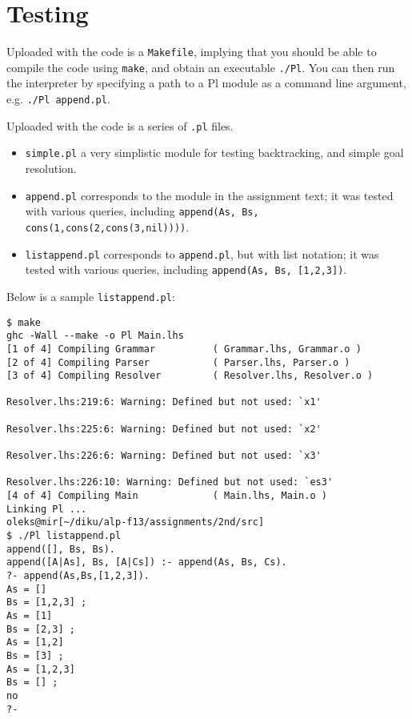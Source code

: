 \section{Testing}\label{section:testing}

Uploaded with the code is a \texttt{Makefile}, implying that you should be able
to compile the code using \texttt{make}, and obtain an executable
\texttt{./Pl}. You can then run the interpreter by specifying a path to a Pl
module as a command line argument, e.g. \texttt{./Pl append.pl}.

Uploaded with the code is a series of \texttt{.pl} files.

\begin{itemize}

\item \texttt{simple.pl} a very simplistic module for testing backtracking, and
simple goal resolution.

\item \texttt{append.pl} corresponds to the module in the assignment text; it
was tested with various queries, including \texttt{append(As, Bs,
cons(1,cons(2,cons(3,nil))))}. 

\item \texttt{listappend.pl} corresponds to \texttt{append.pl}, but with list
notation; it was tested with various queries, including \texttt{append(As, Bs,
[1,2,3])}.

\end{itemize}

Below is a sample \texttt{listappend.pl}:

\begin{verbatim}
$ make
ghc -Wall --make -o Pl Main.lhs
[1 of 4] Compiling Grammar          ( Grammar.lhs, Grammar.o )
[2 of 4] Compiling Parser           ( Parser.lhs, Parser.o )
[3 of 4] Compiling Resolver         ( Resolver.lhs, Resolver.o )

Resolver.lhs:219:6: Warning: Defined but not used: `x1'

Resolver.lhs:225:6: Warning: Defined but not used: `x2'

Resolver.lhs:226:6: Warning: Defined but not used: `x3'

Resolver.lhs:226:10: Warning: Defined but not used: `es3'
[4 of 4] Compiling Main             ( Main.lhs, Main.o )
Linking Pl ...
oleks@mir[~/diku/alp-f13/assignments/2nd/src]
$ ./Pl listappend.pl 
append([], Bs, Bs).
append([A|As], Bs, [A|Cs]) :- append(As, Bs, Cs).
?- append(As,Bs,[1,2,3]).
As = []
Bs = [1,2,3] ;
As = [1]
Bs = [2,3] ;
As = [1,2]
Bs = [3] ;
As = [1,2,3]
Bs = [] ;
no
?- 
\end{verbatim}

